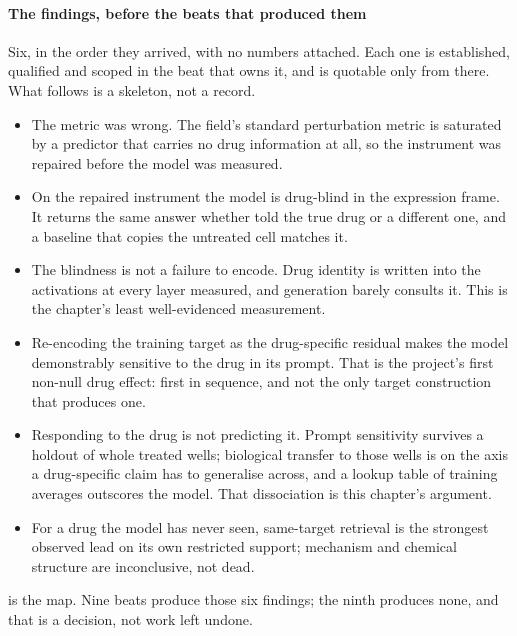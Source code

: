 \paragraph{The findings, before the beats that produced them} Six, in the order
they arrived, with no numbers attached. Each one is established, qualified and
scoped in the beat that owns it, and is quotable only from there. What follows
is a skeleton, not a record.

\begin{itemize}
\item The metric was wrong. The field's standard perturbation metric is saturated
  by a predictor that carries no drug information at all, so the instrument was
  repaired before the model was measured.
\item On the repaired instrument the model is drug-blind in the expression
  frame. It returns the same answer whether told the true drug or a different
  one, and a baseline that copies the untreated cell matches it.
\item The blindness is not a failure to encode. Drug identity is written into
  the activations at every layer measured, and generation barely consults it.
  This is the chapter's least well-evidenced measurement.
\item Re-encoding the training target as the drug-specific residual makes the
  model demonstrably sensitive to the drug in its prompt. That is the project's
  first non-null drug effect: first in sequence, and not the only target
  construction that produces one.
\item Responding to the drug is not predicting it. Prompt sensitivity survives a
  holdout of whole treated wells; biological transfer to those wells is
  \notestablished on the axis a drug-specific claim has to generalise across, and
  a lookup table of training averages outscores the model. That dissociation is
  this chapter's argument.
\item For a drug the model has never seen, same-target retrieval is the
  strongest observed lead on its own restricted support; mechanism and chemical
  structure are inconclusive, not dead.
\end{itemize}

\noindent
{} is the map. Nine beats produce those six findings; the ninth
produces none, and that is a decision, not work left undone.

